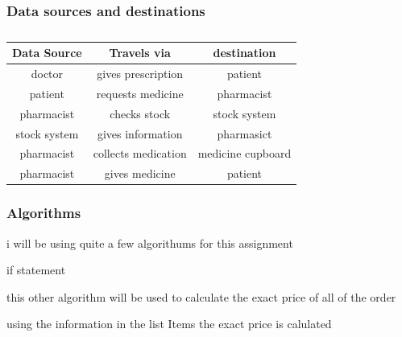 \subsubsection{Data sources and destinations}
\begin{table}[h]
\begin{tabular}{|c|c|c|}
\hline
Data Source & Travels via & destination\\
\hline
doctor & gives prescription & patient\\
\hline
patient & requests medicine & pharmacist\\
\hline
pharmacist & checks stock & stock system\\
\hline 
stock system & gives information & pharmasict\\
\hline
pharmacist & collects medication & medicine cupboard\\
\hline
pharmacist & gives medicine & patient\\
\hline
\end{tabular}
\caption{}
\label{tab:}
\end{table}

\subsubsection{Algorithms}
i will be using quite a few algorithums for this assignment
\begin{algorithm}
    \caption{if statement}
\begin{algorithmic}[1]
	\Else
	\EndIf
\EndFor
\end{algorithmic}
\end{algorithm}

this other algorithm will be used to calculate the exact price of all of the order 
\begin{algorithm}[h]
\begin{algorithmic}[1]
\Else
\EndIf
\end{algorithmic}
\end{algorithm}

using the information in the list Items the exact price is calulated
\begin{algorithm}[h]
\begin{algorithmic}[1]
\Else
\EndIf
\end{algorithmic}
\end{algorithm}

